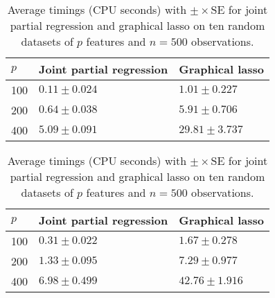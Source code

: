 \documentclass{article}
\begin{document}

\begin{table}[ht]
    \centering
    \caption{Average timings (CPU seconds) with $\pm \times \mathrm{SE}$ for
        joint partial regression and graphical lasso on ten random datasets of
        $p$ features and $n=500$ observations. }
    \label{tab:timings}
    
    \begin{subtable}{\textwidth}\label{tab:timings-tol}
        \centering
        \begin{tabular}{lll}
            \toprule
            $p$ & Joint partial regression & Graphical lasso \\
            \midrule
                100 & $\mathbf{0.11 \pm 0.024}$  & $1.01 \pm 0.227$ \\
                200 & $\mathbf{0.64 \pm 0.038}$  & $5.91 \pm 0.706$ \\
                400 & $\mathbf{5.09 \pm 0.091}$  & $29.81 \pm 3.737$ \\
            \bottomrule
        \end{tabular}
    \end{subtable}
    \begin{subtable}{\textwidth}\label{tab:timings-max_iter}
        \centering

       \begin{tabular}{lll}
            \toprule
            $p$ & Joint partial regression & Graphical lasso \\ 
            \midrule
            100 & $\mathbf{0.31 \pm 0.022}$ & $1.67 \pm 0.278$ \\
            200 & $\mathbf{1.33 \pm 0.095}$ & $7.29 \pm 0.977$ \\
            400 & $\mathbf{6.98 \pm 0.499}$ & $42.76 \pm 1.916$ \\
            \bottomrule
        \end{tabular}
    \end{subtable}
\end{table}
\end{document}
